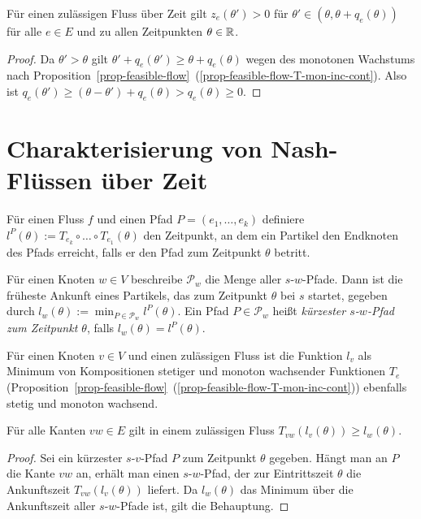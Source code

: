 
\begin{corollary}\label{cor-queue-positive-inbetween}
		Für einen zulässigen  Fluss über Zeit gilt $z_e(\theta') > 0$ für $\theta'\in(\theta, \theta + q_e(\theta))$ für alle $e\in E$ und zu allen Zeitpunkten $\theta\in\mathbb{R}$.
\end{corollary}
\begin{proof}
	Da $\theta'>\theta$ gilt $\theta' + q_e(\theta') \geq \theta + q_e(\theta)$ wegen des monotonen Wachstums nach Proposition~\ref{prop-feasible-flow}~(\ref{prop-feasible-flow-T-mon-inc-cont}).
	Also ist $q_e(\theta') \geq (\theta - \theta') + q_e(\theta) > q_e(\theta)\geq 0$.	
\end{proof}


\section{Charakterisierung von Nash-Flüssen über Zeit}

\begin{definition}
	Für einen Fluss $f$ und einen Pfad $P=(e_1,\dots,e_k)$ definiere $l^P(\theta):=T_{e_k}\circ\dots\circ T_{e_1}(\theta)$ den Zeitpunkt, an dem ein Partikel den Endknoten des Pfads erreicht, falls er den Pfad zum Zeitpunkt $\theta$ betritt.
	
	Für einen Knoten $w\in V$ beschreibe $\mathcal{P}_w$ die Menge aller $s$-$w$-Pfade.
	Dann ist die früheste Ankunft eines Partikels, das zum Zeitpunkt $\theta$ bei $s$ startet, gegeben durch $l_w(\theta):=\min_{P\in\mathcal{P}_w}l^P(\theta)$.
	Ein Pfad $P\in \mathcal{P}_w$ heißt \emph{kürzester $s$-$w$-Pfad zum Zeitpunkt $\theta$},  falls $l_w(\theta)=l^P(\theta)$.
\end{definition}


Für einen Knoten $v \in V$ und einen zulässigen Fluss ist die Funktion $l_v$ als Minimum von Kompositionen stetiger und monoton wachsender Funktionen $T_e$ (Proposition~\ref{prop-feasible-flow}~(\ref{prop-feasible-flow-T-mon-inc-cont})) ebenfalls stetig und monoton wachsend.


\begin{lemma}\label{lemma-dreicksungl}
	Für alle Kanten $vw\in E$ gilt in einem zulässigen Fluss 
	$T_{vw}(l_v(\theta)) \geq l_w(\theta)$.
\end{lemma}
\begin{proof}
	Sei ein kürzester $s$-$v$-Pfad $P$ zum Zeitpunkt $\theta$ gegeben.
	Hängt man an $P$ die Kante $vw$ an, erhält man einen $s$-$w$-Pfad, der zur Eintrittszeit $\theta$ die Ankunftszeit $T_{vw}(l_v(\theta))$ liefert.
	Da $l_w(\theta)$ das Minimum über die Ankunftszeit aller $s$-$w$-Pfade ist, gilt die Behauptung.
\end{proof}

